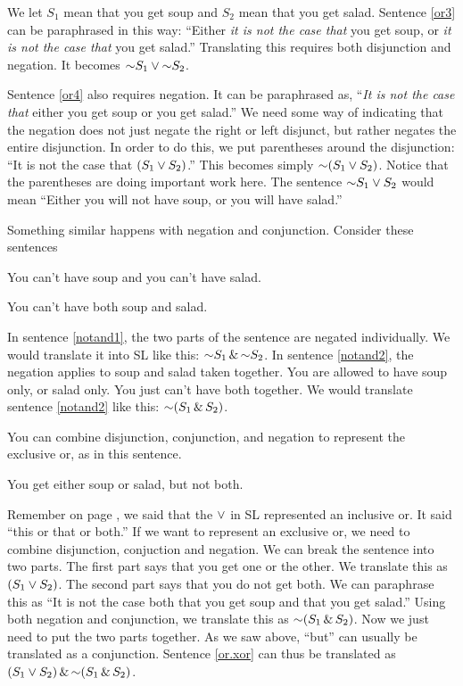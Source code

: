 We let $S_1$ mean that you get soup and $S_2$ mean that you get salad. Sentence \ref{or3} can be paraphrased in this way: ``Either \emph{it is not the case that} you get soup, or \emph{it is not the case that} you get salad.'' Translating this requires both disjunction and negation. It becomes $\mathord{\sim} S_1 \vee \mathord{\sim} S_2$.

Sentence \ref{or4} also requires negation. It can be paraphrased as, ``\emph{It is not the case that} either you get soup or you get salad.'' We need some way of indicating that the negation does not just negate the right or left disjunct, but rather negates the entire disjunction. In order to do this, we put parentheses around the disjunction: ``It is not the case that $(S_1 \vee S_2)$.'' This becomes simply $\mathord{\sim} (S_1 \vee S_2)$. Notice that the parentheses are doing important work here. The sentence $\mathord{\sim} S_1 \vee S_2$ would mean ``Either you will not have soup, or you will have salad.''

Something similar happens with negation and conjunction. Consider these sentences

\begin{earg}
\item[\ex{notand1}] You can't have soup and you can't have salad.
\item[\ex{notand2}] You can't have both soup and salad. 
\end{earg}

In sentence \ref{notand1}, the two parts of the sentence are negated individually. We would translate it into SL like this: $\mathord{\sim} S_1 \,\&\, \mathord{\sim} S_2$. In sentence \ref{notand2}, the negation applies to soup and salad taken together. You are allowed to have soup only, or salad only. You just can't have both together. We would translate sentence \ref{notand2} like this: $\mathord{\sim}(S_1 \,\&\, S_2)$. 

You can combine disjunction, conjunction, and negation to represent the exclusive or, as in this sentence. 

\begin{earg}
\item[\ex{or.xor}] You get either soup or salad, but not both.
\end{earg}

Remember on page \pageref{def:inclusive_or}, we said that the $\vee$ in SL represented an inclusive or. It said ``this or that or both.'' If we want to represent an exclusive or, we need to combine disjunction, conjuction and negation. We can break the sentence into two parts. The first part says that you get one or the other. We translate this as $(S_1 \vee S_2)$. The second part says that you do not get both. We can paraphrase this as ``It is not the case both that you get soup and that you get salad.'' Using both negation and conjunction, we translate this as $\mathord{\sim}(S_1 \,\&\, S_2)$. Now we just need to put the two parts together. As we saw above, ``but'' can usually be translated as a conjunction. Sentence \ref{or.xor} can thus be translated as $(S_1 \vee S_2) \,\&\, \mathord{\sim}(S_1 \,\&\, S_2)$.

